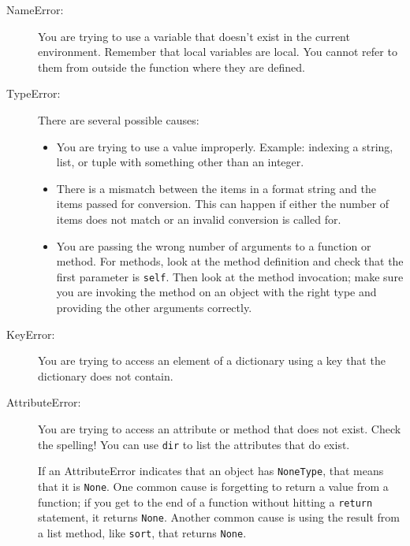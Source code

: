 \documentclass[10pt]{book}
\begin{document}
\begin{description}

\item[NameError:]  You are trying to use a variable that doesn't
exist in the current environment.
Remember that local variables are local.  You
cannot refer to them from outside the function where they are defined.


\item[TypeError:] There are several possible causes:

\begin{itemize}

\item  You are trying to use a value improperly.  Example: indexing
a string, list, or tuple with something other than an integer.


\item There is a mismatch between the items in a format string and
the items passed for conversion.  This can happen if either the number
of items does not match or an invalid conversion is called for.


\item You are passing the wrong number of arguments to a function or method.
For methods, look at the method definition and
check that the first parameter is {\tt self}.  Then look at the
method invocation; make sure you are invoking the method on an
object with the right type and providing the other arguments
correctly.

\end{itemize}

\item[KeyError:]  You are trying to access an element of a dictionary
using a key that the dictionary does not contain.


\item[AttributeError:] You are trying to access an attribute or method
that does not exist.  Check the spelling!  You can use
{\tt dir} to list the attributes that do exist.

If an AttributeError indicates that an object has {\tt NoneType},
that means that it is {\tt None}.  One common cause is forgetting
to return a value from a function; if you get to the end of
a function without hitting a {\tt return} statement, it returns
{\tt None}.  Another common cause is using the result from
a list method, like {\tt sort}, that returns {\tt None}.


\end{description}
\end{document}
